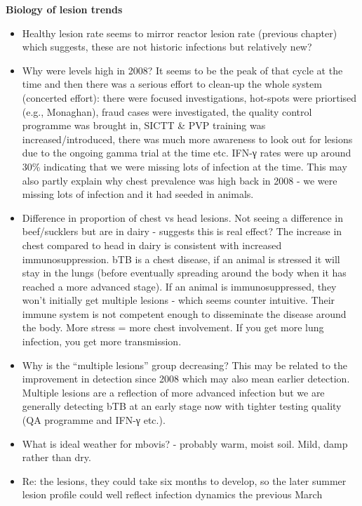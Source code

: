 \documentclass[
  letterpaper,
  DIV=11,
  numbers=noendperiod]{scrreprt}
\begin{document}
\textbf{Biology of lesion trends}

\begin{itemize}
\item
  Healthy lesion rate seems to mirror reactor lesion rate (previous
  chapter) which suggests, these are not historic infections but
  relatively new?
\item
  Why were levels high in 2008? It seems to be the peak of that cycle at
  the time and then there was a serious effort to clean-up the whole
  system (concerted effort): there were focused investigations,
  hot-spots were priortised (e.g., Monaghan), fraud cases were
  investigated, the quality control programme was brought in, SICTT \&
  PVP training was increased/introduced, there was much more awareness
  to look out for lesions due to the ongoing gamma trial at the time
  etc. IFN-γ rates were up around 30\% indicating that we were missing
  lots of infection at the time. This may also partly explain why chest
  prevalence was high back in 2008 - we were missing lots of infection
  and it had seeded in animals.
\item
  Difference in proportion of chest vs head lesions. Not seeing a
  difference in beef/sucklers but are in dairy - suggests this is real
  effect? The increase in chest compared to head in dairy is consistent
  with increased immunosuppression. bTB is a chest disease, if an animal
  is stressed it will stay in the lungs (before eventually spreading
  around the body when it has reached a more advanced stage). If an
  animal is immunosuppressed, they won't initially get multiple lesions
  - which seems counter intuitive. Their immune system is not competent
  enough to disseminate the disease around the body. More stress = more
  chest involvement. If you get more lung infection, you get more
  transmission.
\item
  Why is the ``multiple lesions'' group decreasing? This may be related
  to the improvement in detection since 2008 which may also mean earlier
  detection. Multiple lesions are a reflection of more advanced
  infection but we are generally detecting bTB at an early stage now
  with tighter testing quality (QA programme and IFN-γ etc.).
\item
  What is ideal weather for mbovis? - probably warm, moist soil. Mild,
  damp rather than dry.
\item
  Re: the lesions, they could take six months to develop, so the later
  summer lesion profile could well reflect infection dynamics the
  previous March
\end{itemize}
\end{document}
